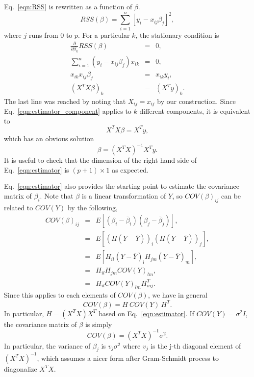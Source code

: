 Eq.~\ref{eqn:RSS} is rewritten as a function of $\beta$.
\begin{equation}
RSS(\beta) = \sum_{i=1}^{n}\left[ y_i - x_{ij}\beta_j\right]^2,
\end{equation}
where $j$ runs from $0$ to $p$. For a particular $k$, the stationary condition is
\begin{eqnarray}
\frac{\partial}{\partial\beta_k}RSS(\beta) &=& 0, \\
\sum_{i=1}^{n}\left(y_i-x_{ij}\beta_j\right)x_{ik} & = & 0,\\
x_{ik}x_{ij}\beta_j &=& x_{ik}y_i, \\
(X^TX\beta)_k &=& (X^Ty)_k.\label{eqn:estimator_component}
\end{eqnarray} 
The last line was reached by noting that $X_{ij}=x_{ij}$ by our construction. Since Eq.~\ref{eqn:estimator_component} applies to $k$ different components, it is equivalent to
\begin{equation}
X^TX\beta = X^Ty,
\end{equation}
which has an obvious solution
\begin{equation}
	\beta = (X^TX)^{-1}X^Ty.\label{eqn:estimator}
\end{equation}
It is useful to check that the dimension of the right hand side of Eq.~\ref{eqn:estimator} is $(p+1)\times1$ as expected.

Eq.~\ref{eqn:estimator} also provides the starting point to estimate the covariance matrix of $\beta_i$. Note that $\beta$ is a linear transformation of $Y$, so $COV(\beta)_{ij}$ can be related to $COV(Y)$ by the following,
\begin{eqnarray}
	COV(\beta)_{ij} &=& E[(\beta_i-\bar\beta_i)(\beta_j-\bar\beta_j)],\\
		       &=&E[(H(Y-\bar Y))_i(H(Y-\bar Y))_j],\\
		       &=&E[H_{il}(Y-\bar Y)_{l}H_{jm}(Y-\bar Y)_{m}],\\
		       &=&H_{il}H_{jm}COV(Y)_{lm},\\
			&=&H_{il}COV(Y)_{lm}H^T_{mj}.
\end{eqnarray}
Since this applies to each elements of $COV(\beta)$, we have in general
\begin{equation}
	COV(\beta) = H\ COV(Y)\ H^T.
\end{equation}
In particular, $H=(X^TX)X^T$ based on Eq.~\ref{eqn:estimator}. If $COV(Y)=\sigma^2I$, the covariance matrix of $\beta$ is simply
\begin{equation}
	COV(\beta) = (X^TX)^{-1}\sigma^2.
\end{equation} In particular, the variance of $\beta_j$ is $v_j\sigma^2$ where $v_j$ is the j-th diagonal element of $(X^TX)^{-1}$, which assumes a nicer form after Gram-Schmidt process to diagonalize $X^TX$.

